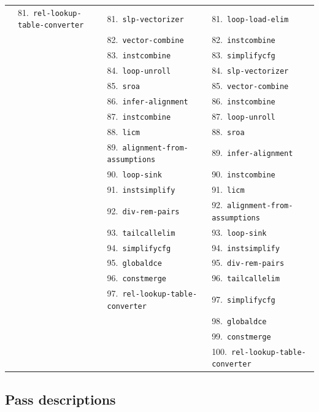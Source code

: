 \documentclass[11pt,a4paper]{article}
\begin{document}
{\begin{longtable}{llll}
 & 81.~\texttt{rel-lookup-table-converter} & 81.~\texttt{slp-vectorizer} & 81.~\texttt{loop-load-elim} \\
 &  & 82.~\texttt{vector-combine} & 82.~\texttt{instcombine} \\
 &  & 83.~\texttt{instcombine} & 83.~\texttt{simplifycfg} \\
 &  & 84.~\texttt{loop-unroll} & 84.~\texttt{slp-vectorizer} \\
 &  & 85.~\texttt{sroa} & 85.~\texttt{vector-combine} \\
 &  & 86.~\texttt{infer-alignment} & 86.~\texttt{instcombine} \\
 &  & 87.~\texttt{instcombine} & 87.~\texttt{loop-unroll} \\
 &  & 88.~\texttt{licm} & 88.~\texttt{sroa} \\
 &  & 89.~\texttt{alignment-from-assumptions} & 89.~\texttt{infer-alignment} \\
 &  & 90.~\texttt{loop-sink} & 90.~\texttt{instcombine} \\
 &  & 91.~\texttt{instsimplify} & 91.~\texttt{licm} \\
 &  & 92.~\texttt{div-rem-pairs} & 92.~\texttt{alignment-from-assumptions} \\
 &  & 93.~\texttt{tailcallelim} & 93.~\texttt{loop-sink} \\
 &  & 94.~\texttt{simplifycfg} & 94.~\texttt{instsimplify} \\
 &  & 95.~\texttt{globaldce} & 95.~\texttt{div-rem-pairs} \\
 &  & 96.~\texttt{constmerge} & 96.~\texttt{tailcallelim} \\
 &  & 97.~\texttt{rel-lookup-table-converter} & 97.~\texttt{simplifycfg} \\
 &  &  & 98.~\texttt{globaldce} \\
 &  &  & 99.~\texttt{constmerge} \\
 &  &  & 100.~\texttt{rel-lookup-table-converter} \\
\hline
\end{longtable}
}

\subsection*{Pass descriptions}
\end{document}
